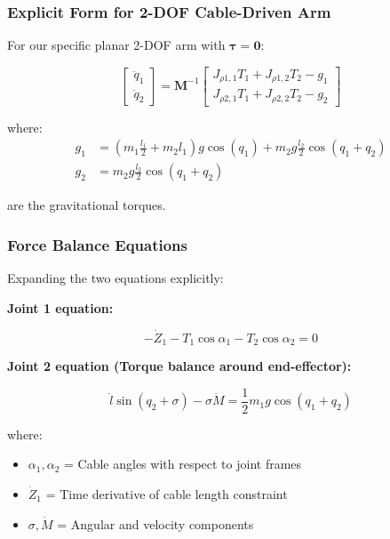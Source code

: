 \subsubsection{Explicit Form for 2-DOF Cable-Driven Arm}

For our specific planar 2-DOF arm with $\boldsymbol{\tau} = \mathbf{0}$:

\begin{equation}
\begin{bmatrix}
\ddot{q}_1 \\
\ddot{q}_2
\end{bmatrix} = \mathbf{M}^{-1} \begin{bmatrix}
J_{\rho 1,1} T_1 + J_{\rho 1,2} T_2 - g_1 \\
J_{\rho 2,1} T_1 + J_{\rho 2,2} T_2 - g_2
\end{bmatrix}
\end{equation}

where:
\begin{align}
g_1 &= \left(m_1 \frac{l_1}{2} + m_2 l_1\right) g \cos(q_1) + m_2 g \frac{l_2}{2} \cos(q_1 + q_2) \\
g_2 &= m_2 g \frac{l_2}{2} \cos(q_1 + q_2)
\end{align}

are the gravitational torques.

\subsubsection{Force Balance Equations}

Expanding the two equations explicitly:

\textbf{Joint 1 equation:}

\begin{equation}
-\dot{Z}_1 - T_1 \cos \alpha_1 - T_2 \cos \alpha_2 = 0
\end{equation}

\textbf{Joint 2 equation (Torque balance around end-effector):}

\begin{equation}
\dot{l}\sin(q_2 + \sigma) - \sigma \dot{M} = \frac{1}{2}m_1 g \cos(q_1 + q_2)
\end{equation}

where:
\begin{itemize}
    \item $\alpha_1, \alpha_2$ = Cable angles with respect to joint frames
    \item $\dot{Z}_1$ = Time derivative of cable length constraint
    \item $\sigma, \dot{M}$ = Angular and velocity components
\end{itemize}


